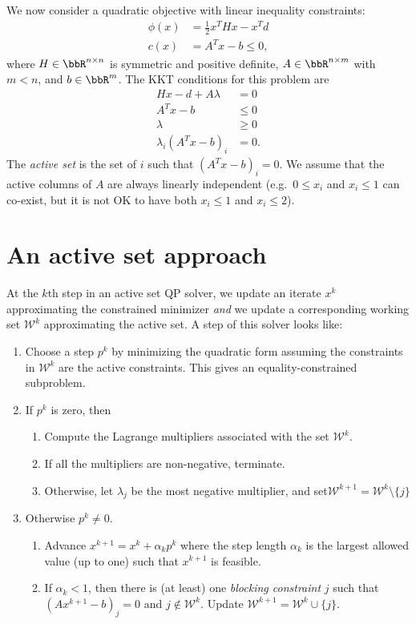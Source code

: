 \documentclass[12pt, leqno]{article} %
\begin{document}
We now consider a quadratic objective with linear
inequality constraints:
\begin{align*}
  \phi(x) &= \frac{1}{2} x^T H x - x^T d \\
  c(x) &= A^T x-b \leq 0,
\end{align*}
where $H \in \bbR^{n \times n}$ is symmetric and positive definite,
$A \in \bbR^{n \times m}$ with $m < n$, and $b \in \bbR^m$.
The KKT conditions for this problem are
\begin{align*}
  Hx - d + A\lambda &= 0 \\
  A^T x-b & \leq 0 \\
  \lambda & \geq 0 \\
  \lambda_i (A^T x-b)_i &= 0.
\end{align*}
The {\em active set} is the set of $i$ such that $(A^T x-b)_i = 0$.
We assume that the active columns of $A$ are always linearly
independent (e.g.~$0 \leq x_i$ and $x_i \leq 1$ can co-exist,
but it is not OK to have both $x_i \leq 1$ and $x_i \leq 2$).

\section{An active set approach}

At the $k$th step in an active set QP solver, we update an iterate
$x^k$ approximating the constrained minimizer {\em and}
we update a corresponding working set $\mathcal{W}^k$ approximating
the active set.  A step of this solver looks like:
\begin{enumerate}
\item Choose a step $p^k$ by minimizing the quadratic form assuming
  the constraints in $\mathcal{W}^k$ are the active constraints.
  This gives an equality-constrained subproblem.
\item If $p^k$ is zero, then
  \begin{enumerate}
  \item Compute the Lagrange multipliers associated with the set
    $\mathcal{W}^k$.
  \item If all the multipliers are non-negative, terminate.
  \item Otherwise, let $\lambda_j$ be the most negative multiplier,
    and set$\mathcal{W}^{k+1} = \mathcal{W}^k \setminus \{ j \}$
  \end{enumerate}
\item Otherwise $p^k \neq 0$.
  \begin{enumerate}
  \item Advance $x^{k+1} = x^k + \alpha_k p^k$ where the step length
    $\alpha_k$ is the largest allowed value (up to one) such that
    $x^{k+1}$ is feasible.
  \item If $\alpha_k < 1$, then there is (at least)
    one {\em blocking constraint} $j$ such that $(Ax^{k+1}-b)_j = 0$ and
    $j \not \in \mathcal{W}^k$.
    Update $\mathcal{W}^{k+1} = \mathcal{W}^k \cup \{ j \}$.
  \end{enumerate}
\end{enumerate}
\end{document}
